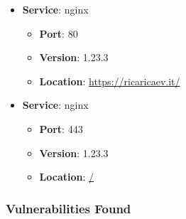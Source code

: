 \documentclass{article}
\begin{document}
\begin{itemize}
    
        \item \textbf{Service}: nginx
        \begin{itemize}
            \item \textbf{Port}: 80
            \item \textbf{Version}:  1.23.3 
            \item \textbf{Location}: \href{ https://ricaricaev.it/ }{ https://ricaricaev.it/ }
        \end{itemize}
    
        \item \textbf{Service}: nginx
        \begin{itemize}
            \item \textbf{Port}: 443
            \item \textbf{Version}:  1.23.3 
            \item \textbf{Location}: \href{ / }{ / }
        \end{itemize}
    
\end{itemize}


\subsubsection*{Vulnerabilities Found}
\end{document}
